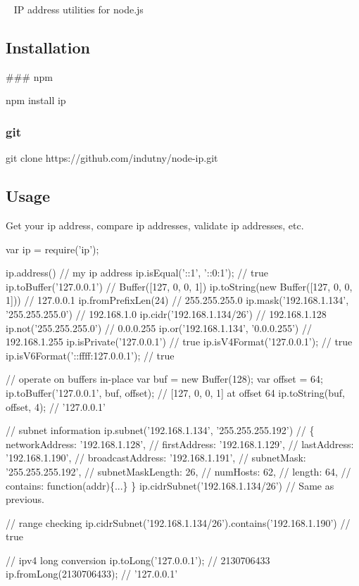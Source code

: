 \href{https://www.npmjs.com/package/ip}{\tt } ~\newline
 IP address utilities for node.\+js

\subsection*{Installation}

\#\#\# npm 
\begin{DoxyCode}
npm install ip
\end{DoxyCode}


\subsubsection*{git}


\begin{DoxyCode}
git clone https://github.com/indutny/node-ip.git
\end{DoxyCode}


\subsection*{Usage}

Get your ip address, compare ip addresses, validate ip addresses, etc.


\begin{DoxyCode}
var ip = require('ip');

ip.address() // my ip address
ip.isEqual('::1', '::0:1'); // true
ip.toBuffer('127.0.0.1') // Buffer([127, 0, 0, 1])
ip.toString(new Buffer([127, 0, 0, 1])) // 127.0.0.1
ip.fromPrefixLen(24) // 255.255.255.0
ip.mask('192.168.1.134', '255.255.255.0') // 192.168.1.0
ip.cidr('192.168.1.134/26') // 192.168.1.128
ip.not('255.255.255.0') // 0.0.0.255
ip.or('192.168.1.134', '0.0.0.255') // 192.168.1.255
ip.isPrivate('127.0.0.1') // true
ip.isV4Format('127.0.0.1'); // true
ip.isV6Format('::ffff:127.0.0.1'); // true

// operate on buffers in-place
var buf = new Buffer(128);
var offset = 64;
ip.toBuffer('127.0.0.1', buf, offset);  // [127, 0, 0, 1] at offset 64
ip.toString(buf, offset, 4);            // '127.0.0.1'

// subnet information
ip.subnet('192.168.1.134', '255.255.255.192')
// \{ networkAddress: '192.168.1.128',
//   firstAddress: '192.168.1.129',
//   lastAddress: '192.168.1.190',
//   broadcastAddress: '192.168.1.191',
//   subnetMask: '255.255.255.192',
//   subnetMaskLength: 26,
//   numHosts: 62,
//   length: 64,
//   contains: function(addr)\{...\} \}
ip.cidrSubnet('192.168.1.134/26')
// Same as previous.

// range checking
ip.cidrSubnet('192.168.1.134/26').contains('192.168.1.190') // true


// ipv4 long conversion
ip.toLong('127.0.0.1'); // 2130706433
ip.fromLong(2130706433); // '127.0.0.1'
\end{DoxyCode}


